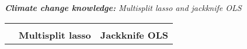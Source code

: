 \documentclass[a4paper,12pt]{article}
\begin{document}
{\centering
\begin{threeparttable}


\singlespacing
\caption{\textit{\textbf{Climate change knowledge:} Multisplit lasso and jackknife OLS}}

 
\label{Know435} 
\centering
\begin{small}
\begin{tabular}{lclrcl} 
\hline \vspace{-0.2cm} \\
  \multicolumn{1}{l}{} & \multicolumn{2}{c}{\large{\textbf{Multisplit lasso}}}& \multicolumn{3}{c}{\large{\textbf{Jackknife OLS}}}  \\
  

\end{tabular}
\end{small}
\end{threeparttable}}
\end{document}

